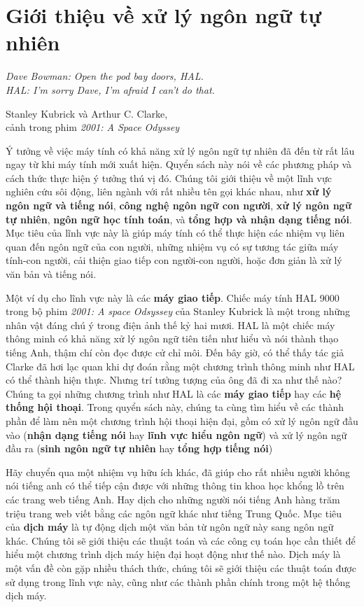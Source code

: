 \setcounter{chapter}{0}

\chapter{Giới thiệu về xử lý ngôn ngữ tự nhiên}

\setlength{}
\epigraphfontsize{\small}
\epigraph{
\itshape Dave Bowman: Open the pod bay doors, HAL.\\
HAL: I'm sorry Dave, I'm afraid I can't do that.\\
}{Stanley Kubrick và Arthur C. Clarke,\\
cảnh trong phim \textit{2001: A Space Odyssey}}

Ý tưởng về việc máy tính có khả năng xử lý ngôn ngữ tự nhiên đã đến từ rất lâu ngay từ khi máy tính mới xuất hiện. Quyển sách này nói về các phương pháp và cách thức thực hiện ý tưởng thú vị đó. Chúng tôi giới thiệu về một lĩnh vực nghiên cứu sôi động, liên ngành với rất nhiều tên gọi khác nhau, như \textbf{xử lý ngôn ngữ và tiếng nói}, \textbf{công nghệ ngôn ngữ con người}, \textbf{xử lý ngôn ngữ tự nhiên}, \textbf{ngôn ngữ học tính toán}, và \textbf{tổng hợp và nhận dạng tiếng nói}. Mục tiêu của lĩnh vực này là giúp máy tính có thể thực hiện các nhiệm vụ liên quan đến ngôn ngữ của con người, những nhiệm vụ có sự tương tác giữa máy tính-con người, cải thiện giao tiếp con người-con người, hoặc đơn giản là xử lý văn bản và tiếng nói.

Một ví dụ cho lĩnh vực này là các \textbf{máy giao tiếp}. Chiếc máy tính HAL 9000 trong bộ phim \textit{2001: A space Odsyssey} của Stanley Kubrick là một trong những nhân vật đáng chú ý trong điện ảnh thế kỷ hai mươi. HAL là một chiếc máy thông minh có khả năng xử lý ngôn ngữ tiên tiến như hiểu và nói thành thạo tiếng Anh, thậm chí còn đọc được cử chỉ môi. Đến bây giờ, có thể thấy tác giả Clarke đã hơi lạc quan khi dự đoán rằng một chương trình thông minh như HAL có thể thành hiện thực. Nhưng trí tưởng tượng của ông đã đi xa như thế nào? Chúng ta gọi những chương trình như HAL là các \textbf{máy giao tiếp} hay các \textbf{hệ thống hội thoại}. Trong quyển sách này, chúng ta cùng tìm hiểu về các thành phần để làm nên một chương trình hội thoại hiện đại, gồm có xử lý ngôn ngữ đầu vào (\textbf{nhận dạng tiếng nói} hay \textbf{lĩnh vực hiểu ngôn ngữ}) và xử lý ngôn ngữ đầu ra (\textbf{sinh ngôn ngữ tự nhiên} hay \textbf{tổng hợp tiếng nói})

Hãy chuyển qua một nhiệm vụ hữu ích khác, đã giúp cho rất nhiều người không nói tiếng anh có thể tiếp cận được với những thông tin khoa học khổng lồ trên các trang web tiếng Anh. Hay dịch cho những người nói tiếng Anh hàng trăm triệu trang web viết bằng các ngôn ngữ khác như tiếng Trung Quốc. Mục tiêu của \textbf{dịch máy} là tự động dịch một văn bản từ ngôn ngữ này sang ngôn ngữ khác. Chúng tôi sẽ giới thiệu các thuật toán và các công cụ toán học cần thiết để hiểu một chương trình dịch máy hiện đại hoạt động như thế nào. Dịch máy là một vấn đề còn gặp nhiều thách thức, chúng tôi sẽ giới thiệu các thuật toán được sử dụng trong lĩnh vực này, cũng như các thành phần chính trong một hệ thống dịch máy.

